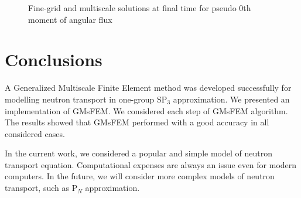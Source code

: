 \documentclass[preprint]{elsarticle}
\begin{document}
\begin{figure}[ht]
	\caption{Fine-grid and multiscale solutions at final time for pseudo 0th moment of angular flux}
	\label{twigl_solutions}
\end{figure}

\section{Conclusions}
A Generalized Multiscale Finite Element method was developed successfully for modelling neutron transport in one-group SP$_3$ approximation.  
We presented an implementation of GMsFEM. 
We considered each step of GMsFEM algorithm.
The results showed that GMsFEM performed with a good accuracy in all considered cases.

In the current work, we considered a popular and simple model of neutron transport equation.
Computational expenses are always an issue even for modern computers.
In the future, we will consider more complex models of neutron transport, such as P$_N$ approximation. 

\end{document}
